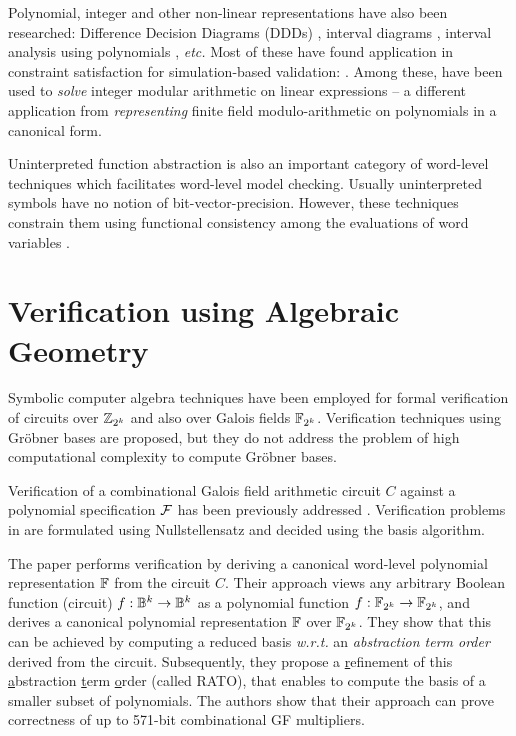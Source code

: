 Polynomial, integer and other non-linear representations have also
been researched: Difference Decision Diagrams (DDDs) \cite{ddd-csl99,ddd-mt-98}, interval
diagrams \cite{interval_dd}, interval analysis using polynomials
\cite{polynomial_sanchez99}, {\it etc.} Most of these have found 
application in constraint satisfaction for simulation-based
validation:  \cite{Ritter99,hsat,lpsat,brinkmann:asp-dac,Huang:tcad01,bitvector98}. Among
these, \cite{brinkmann:asp-dac,Huang:tcad01,bitvector98}
have been used to {\it solve} integer modular arithmetic on linear
expressions -- a different application from {\it representing}
finite field modulo-arithmetic on polynomials in a canonical form.   

Uninterpreted function abstraction is also an important category of 
word-level techniques which facilitates word-level model checking.
Usually uninterpreted symbols have no notion of bit-vector-precision. However, these techniques
constrain them 
using functional consistency among the evaluations of word variables
\cite{UF1,UF2,UF3}.


\section{Verification using Algebraic Geometry}

Symbolic computer algebra techniques have been employed for formal
verification of circuits over ${\mathbb{Z}}_{2^k}$ and also over
Galois fields ${\mathbb{F}}_{2^k}$. 
Verification techniques using Gr\"obner bases
\cite{Avrunin:CAV,gbverify:2007,manna:program} are proposed,
but they do not address the problem of high computational complexity to
compute Gr\"obner bases.

Verification of a combinational Galois field arithmetic circuit $C$ against a
polynomial specification ${\mathcal{F}}$ has been previously addressed 
\cite{ibm:blueveri,lv:tcad2013,pruss:dac14}. Verification problems in
\cite{ibm:blueveri,lv:tcad2013} are formulated using
Nullstellensatz and decided using the \Grobner basis algorithm.

The paper 
\cite{pruss:dac14} performs verification by deriving a canonical
word-level polynomial representation ${\mathbb{F}}$ from the circuit $C$. Their
approach views any arbitrary Boolean function (circuit) $f: {\mathbb{B}}^k
\rightarrow {\mathbb{B}}^k$ as a polynomial function $f: {\mathbb{F}}_{2^k} \rightarrow {\mathbb{F}}_{2^k}$,
and derives a canonical polynomial representation ${\mathbb{F}}$ over
${\mathbb{F}}_{2^k}$. They show that this can be achieved by computing a reduced 
\Grobner basis {\it w.r.t.} an {\it abstraction term order} derived from the
circuit. Subsequently, they propose a \underline{r}efinement of this
\underline{a}bstraction \underline{t}erm \underline{o}rder (called
RATO), that enables to compute the \Grobner basis of a smaller subset
of polynomials. The authors show that their approach can prove
correctness of up to 571-bit combinational GF multipliers. 

